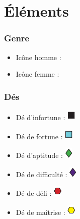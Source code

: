 \documentclass{article}
\begin{document}
\part*{Éléments}
\begin{multicols}{3}
	\section*{Genre}
	\begin{itemize}
		\item Icône homme : \male 
		\item Icône femme : \female
	\end{itemize}
	\section*{Dés}
	\begin{itemize}
		\item Dé d'infortune : {\Large \includegraphics[height=\fontcharht\font`\B]{../img/dice_black}}
		\item Dé de fortune : {\Large \includegraphics[height=\fontcharht\font`\B]{../img/dice_blue}}
		\item Dé d'aptitude : {\Large \includegraphics[height=\fontcharht\font`\B]{../img/dice_green}}
		\item Dé de difficulté : {\Large \includegraphics[height=\fontcharht\font`\B]{../img/dice_purple}}
		\item Dé de défi : {\Large \includegraphics[height=\fontcharht\font`\B]{../img/dice_red}}
		\item Dé de maîtrise : {\Large \includegraphics[height=\fontcharht\font`\B]{../img/dice_yellow}}
	\end{itemize}

\end{multicols}
\end{document}

